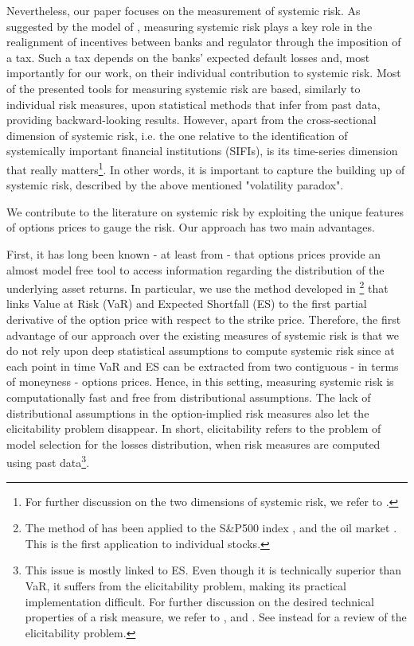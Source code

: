 \documentclass[11pt,a4paper,english]{article}
\begin{document}
Nevertheless, our paper focuses on the measurement of systemic risk. As suggested by the model of \citet{Acharya2017}, measuring systemic risk plays a key role in the realignment of incentives between banks and regulator through the imposition of a tax. Such a tax depends on the banks' expected default losses and, most importantly for our work, on their individual contribution to systemic risk. Most of the presented tools for measuring systemic risk are based, similarly to individual risk measures, upon statistical methods that infer from past data, providing backward-looking results. However, apart from the cross-sectional dimension of systemic risk, i.e. the one relative to the identification of systemically important financial institutions (SIFIs), is its time-series dimension that really matters\footnote{For further discussion on the two dimensions of systemic risk, we refer to \citet{Adrian2016}.}. In other words, it is important to capture the building up of systemic risk, described by the above mentioned "volatility paradox". 

We contribute to the literature on systemic risk by exploiting the unique features of options prices to gauge the risk. Our approach has two main advantages. 

First, it has long been known - at least from \citet{Breeden1978} - that options prices provide an almost model free tool to access information regarding the distribution of the underlying asset returns. In particular, we use the method developed in \citet{GBA16}\footnote{The method of \citet{GBA16} has been applied to the S\&P500 index \citep{Barone-Adesi2016}, and the oil market \citep{Barone-Adesi2016a}. This is the first application to individual stocks.} that links Value at Risk (VaR) and Expected Shortfall (ES) to the first partial derivative of the option price with respect to the strike price. Therefore, the first advantage of our approach over the existing measures of systemic risk is that we do not rely upon deep statistical assumptions to compute systemic risk since at each point in time VaR and ES can be extracted from two contiguous - in terms of moneyness - options prices. Hence, in this setting, measuring systemic risk is computationally fast and free from distributional assumptions. The lack of distributional assumptions in the option-implied risk measures also let the elicitability problem disappear. In short, elicitability refers to the problem of model selection for the losses distribution, when risk measures are computed using past data\footnote{This issue is mostly linked to ES. Even though it is technically superior than VaR, it suffers from the elicitability problem, making its practical implementation difficult. For further discussion on the desired technical properties of a risk measure, we refer to \citet{Artzner1999}, and \citet{Acerbi2002}. See instead \citet{Ziegel2016} for a review of the elicitability problem.}.
\end{document}
